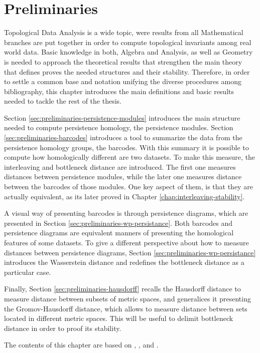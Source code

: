 \chapter{Preliminaries}

Topological Data Analysis is a wide topic, were results from all Mathematical branches are put together in order to compute topological invariants among real world data. Basic knowledge in both, Algebra and Analysis, as well as Geometry is needed to approach the theoretical results that strengthen the main theory that defines proves the needed structures and their stability. Therefore, in order to settle a common base and notation unifying the diverse procedures among bibliography, this chapter introduces the main definitions and basic results needed to tackle the rest of the thesis.

Section \ref{sec:preliminaries-persistence-modules} introduces the main structure needed to compute persistence homology, the persistence modules. Section \ref{sec:preliminaries-barcodes} introduces a tool to summarize the data from the persistence homology groups, the barcodes. With this summary it is possible to compute how homologically different are two datasets. To make this measure, the interleaving and bottleneck distance are introduced. The first one measures distances between persistence modules, while the later one measures distance between the barcodes of those modules. One key aspect of them, is that they are actually equivalent, as its later proved in Chapter \ref{chap:interleaving-stability}.

A visual way of presenting barcodes is through persistence diagrams, which are presented in Section \ref{sec:preliminaries-wp-persistance}. Both barcodes and persistence diagrams are equivalent manners of presenting the homological features of some datasets. To give a different perspective about how to measure distances between persistence diagrams, Section \ref{sec:preliminaries-wp-persistance} introduces the Wasserstein distance and redefines the bottleneck distance as a particular case.

Finally, Section \ref{sec:preliminaries-hausdorff} recalls the Hausdorff distance to measure distance between subsets of metric spaces, and generalices it presenting the Gromov-Hausdorff distance, which allows to measure distance between sets located in different metric spaces. This will be useful to delimit bottleneck distance in order to proof its stability.

The contents of this chapter are based on \cite{burago}, \cite{nanda}, \cite{polterovich} and \cite{wang}.


